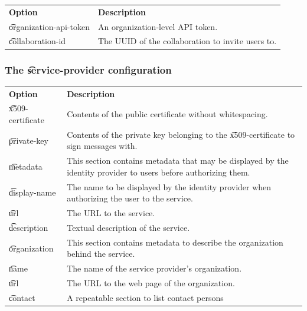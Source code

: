 \begin{tabularx}{\textwidth}{*{1}{!{\VRule[-1pt]}l}!{\VRule[-1pt]}X}
  \headrow
  \textbf{Option}             & \textbf{Description}\\
  \t{organization-api-token}  & An organization-level API token.\\
  \t{collaboration-id}        & The UUID of the collaboration to invite
                                users to.
\end{tabularx}

\subsubsection{The \t{service-provider} configuration}

\begin{tabularx}{\textwidth}{*{1}{!{\VRule[-1pt]}l}!{\VRule[-1pt]}X}
  \headrow
  \textbf{Option}              & \textbf{Description}\\
  \t{x509-certificate}         & Contents of the public certificate without
                                 whitespacing.\\
  \t{private-key}              & Contents of the private key belonging to the
                                 \t{x509-certificate} to sign messages with.\\
  \t{metadata}                 & This section contains metadata that may be
                                 displayed by the identity provider to users
                                 before authorizing them.\\
  \cfgindent\t{display-name}   & The name to be displayed by the identity
                                 provider when authorizing the user to the
                                 service.\\
  \cfgindent\t{url}            & The URL to the service.\\
  \cfgindent\t{description}    & Textual description of the service.\\
  \cfgindent\t{organization}   & This section contains metadata to describe the
                                organization behind the service.\\
  \cfgindent\cfgindent\t{name} & The name of the service provider's organization.\\
  \cfgindent\cfgindent\t{url}  & The URL to the web page of the organization.\\
  \cfgindent\t{contact}        & A repeatable section to list contact persons

\end{tabularx}
